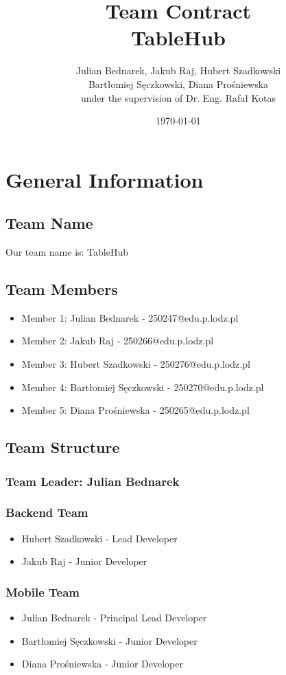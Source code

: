 \documentclass[12pt]{article}
\title{Team Contract \\ \vspace{0.25cm} \large TableHub}
\author{Julian Bednarek, Jakub Raj, Hubert Szadkowski \\ Bartłomiej Sęczkowski, Diana Prośniewska \\ under the supervision of Dr. Eng. Rafał Kotas}
\date{\monthyeardate\today}
\begin{document}
\maketitle
\thispagestyle{empty}
\newpage

\tableofcontents
\newpage

\section{General Information}
\subsection{Team Name}
Our team name is: TableHub

\subsection{Team Members}
\begin{itemize}
    \item Member 1: Julian Bednarek - 250247@edu.p.lodz.pl
    \item Member 2: Jakub Raj - 250266@edu.p.lodz.pl
    \item Member 3: Hubert Szadkowski - 250276@edu.p.lodz.pl
    \item Member 4: Bartłomiej Sęczkowski - 250270@edu.p.lodz.pl
    \item Member 5: Diana Prośniewska - 250265@edu.p.lodz.pl
\end{itemize}
\subsection{Team Structure}
\subsubsection*{Team Leader: \textbf{Julian Bednarek}}
\subsubsection*{Backend Team}
\begin{itemize}
    \item Hubert Szadkowski - Lead Developer
    \item Jakub Raj - Junior Developer
\end{itemize}
\subsubsection*{Mobile Team}
\begin{itemize}
    \item Julian Bednarek - Principal Lead Developer
    \item Bartłomiej Sęczkowski - Junior Developer
    \item Diana Prośniewska - Junior Developer
\end{itemize}
\end{document}
